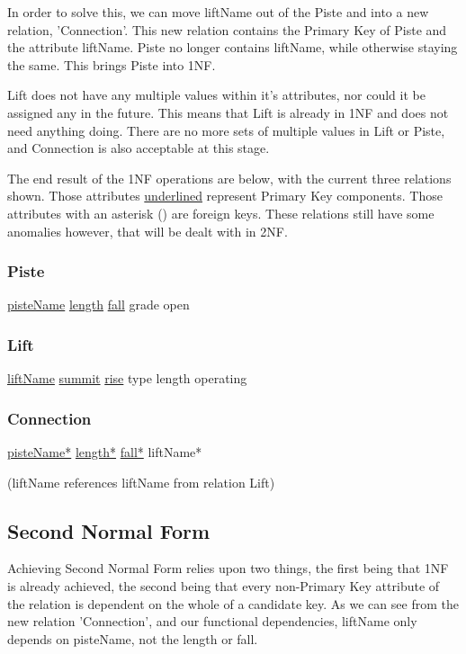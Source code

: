 \documentclass[11pt]{scrartcl} %
\begin{document}
In order to solve this, we can move liftName out of the Piste and into a new relation, 'Connection'. This new relation contains the Primary Key of Piste and the attribute liftName. Piste no longer contains liftName, while otherwise staying the same. This brings Piste into 1NF.

Lift does not have any multiple values within it's attributes, nor could it be assigned any in the future. This means that Lift is already in 1NF and does not need anything doing. There are no more sets of multiple values in Lift or Piste, and Connection is also acceptable at this stage.

The end result of the 1NF operations are below, with the current three relations shown. Those attributes \underline{underlined} represent Primary Key components. Those attributes with an asterisk (\*) are foreign keys. These relations still have some anomalies however, that will be dealt with in 2NF.

\subsubsection{Piste}
\underline{pisteName}\newline
\underline{length}\newline
\underline{fall}\newline
grade\newline
open

\subsubsection{Lift}
\underline{liftName}\newline
\underline{summit}\newline
\underline{rise}\newline
type\newline
length\newline
operating

\subsubsection{Connection}
\underline{pisteName*}\newline
\underline{length*}\newline
\underline{fall*}\newline
liftName*

(liftName references liftName from relation Lift)

\subsection{Second Normal Form}
Achieving Second Normal Form relies upon two things, the first being that 1NF is already achieved, the second being that every non-Primary Key attribute of the relation is dependent on the whole of a candidate key. As we can see from the new relation 'Connection', and our functional dependencies, liftName only depends on pisteName, not the length or fall.
\end{document}
